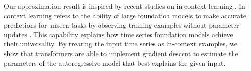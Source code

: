
Our approximation result is inspired by recent studies on in-context learning \cite{bai2024transformers, von2023transformers, li2023transformers, mahankali2023one, ahn2024transformers, zhang2024trained}. 
In-context learning refers to the ability of large foundation models to make accurate predictions for unseen tasks by observing training examples without parameter updates \cite{brown2020language, garg2022can}.
This capability explains how time series foundation models achieve their universality.
By treating the input time series as in-context examples, we show that transformers are able to implement gradient descent to estimate the parameters of the autoregressive model that best explains the given input.




